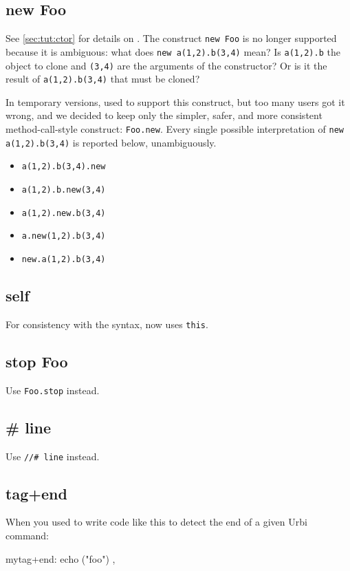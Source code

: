 \subsection{new Foo}

See \autoref{sec:tut:ctor} for details on .  The construct
\lstinline{new Foo} is no longer supported because it is ambiguous:
what does \lstinline{new a(1,2).b(3,4)} mean?  Is
\lstinline{a(1,2).b} the object to clone and \lstinline{(3,4)} are the
arguments of the constructor?  Or is it the result of
\lstinline{a(1,2).b(3,4)} that must be cloned?

In temporary versions,  used to support this  construct,
but too many users got it wrong, and we decided to keep only the
simpler, safer, and more consistent method-call-style construct:
\lstinline{Foo.new}.  Every single possible interpretation of
\lstinline{new a(1,2).b(3,4)} is reported below, unambiguously.
\begin{itemize}
\item \lstinline{a(1,2).b(3,4).new}
\item \lstinline{a(1,2).b.new(3,4)}
\item \lstinline{a(1,2).new.b(3,4)}
\item \lstinline{a.new(1,2).b(3,4)}
\item \lstinline{new.a(1,2).b(3,4)}
\end{itemize}

\subsection{self}
For consistency with the \Cxx syntax, \us now uses \lstinline{this}.

\subsection{stop Foo}

Use \lstinline{Foo.stop} instead.

\subsection{# line}

Use \lstinline{//# line} instead.

\subsection{tag+end}

When you used to write code like this to detect the end of a given Urbi
command:
\begin{urbiscript}
mytag+end: { echo ("foo") },
\end{urbiscript}

